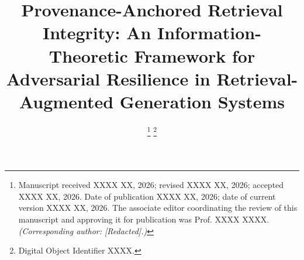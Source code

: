 \documentclass[journal,10pt]{IEEEtran}
\begin{document}
\title{Provenance-Anchored Retrieval Integrity: An Information-Theoretic Framework for Adversarial Resilience in Retrieval-Augmented Generation Systems}

\author{%
\thanks{Manuscript received XXXX XX, 2026; revised XXXX XX, 2026; accepted XXXX XX, 2026. Date of publication XXXX XX, 2026; date of current version XXXX XX, 2026. The associate editor coordinating the review of this manuscript and approving it for publication was Prof. XXXX XXXX. \emph{(Corresponding author: [Redacted].)}}
\thanks{Digital Object Identifier XXXX.}
}


\maketitle
\end{document}
